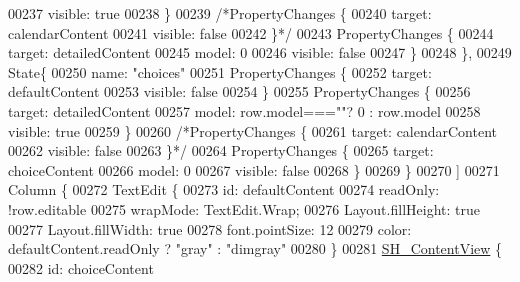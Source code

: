\begin{DoxyCode}
00237                             visible: \textcolor{keyword}{true}
00238                         \}
00239                         \textcolor{comment}{/*PropertyChanges \{}
00240 \textcolor{comment}{                            target: calendarContent}
00241 \textcolor{comment}{                            visible: false}
00242 \textcolor{comment}{                        \}*/}
00243                         PropertyChanges \{
00244                             target: detailedContent
00245                             model: 0
00246                             visible: \textcolor{keyword}{false}
00247                         \}
00248                     \},
00249                     State\{
00250                         name: \textcolor{stringliteral}{"choices"}
00251                         PropertyChanges \{
00252                             target: defaultContent
00253                             visible: \textcolor{keyword}{false}
00254                         \}
00255                         PropertyChanges \{
00256                             target: detailedContent
00257                             model: row.model===\textcolor{stringliteral}{""}? 0  : row.model
00258                             visible: \textcolor{keyword}{true}
00259                         \}
00260                         \textcolor{comment}{/*PropertyChanges \{}
00261 \textcolor{comment}{                            target: calendarContent}
00262 \textcolor{comment}{                            visible: false}
00263 \textcolor{comment}{                        \}*/}
00264                         PropertyChanges \{
00265                             target: choiceContent
00266                             model: 0
00267                             visible: \textcolor{keyword}{false}
00268                         \}
00269                     \}
00270                 ]
00271                 Column \{
00272                     TextEdit \{
00273                         \textcolor{keywordtype}{id}: defaultContent
00274                         readOnly:  !row.editable
00275                         wrapMode: TextEdit.Wrap;
00276                         Layout.fillHeight: \textcolor{keyword}{true}
00277                         Layout.fillWidth: \textcolor{keyword}{true}
00278                         font.pointSize: 12
00279                         color: defaultContent.readOnly ? \textcolor{stringliteral}{"gray"} : \textcolor{stringliteral}{"dimgray"}
00280                     \}
00281                     \hyperlink{classSH__ContentView}{SH\_ContentView} \{
00282                         \textcolor{keywordtype}{id}: choiceContent

\end{DoxyCode}
